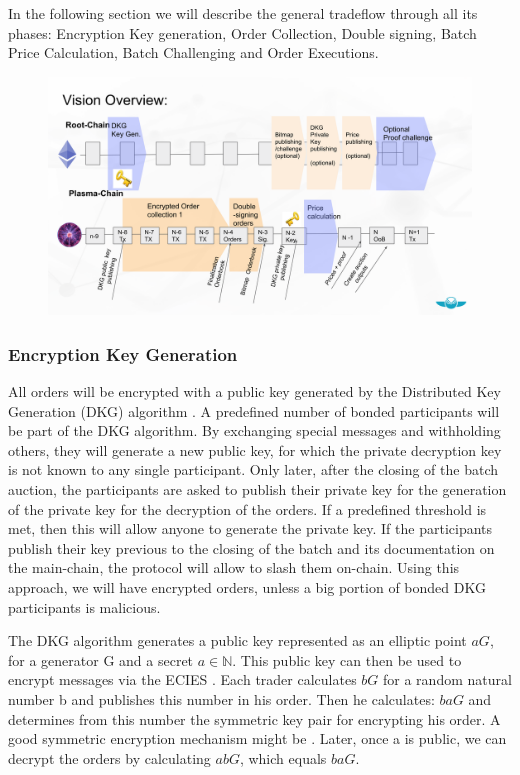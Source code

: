 \documentclass[11pt,parskip=full]{scrartcl}%
\begin{document}
In the following section we will describe the general tradeflow through all its phases: Encryption Key generation, Order Collection, Double signing, Batch Price Calculation, Batch Challenging and Order Executions.


\begin{figure}
\centering
\includegraphics[width=\textwidth]{overview_tradeflow.png}
\end{figure}



\subsubsection{Encryption Key Generation}
All orders will be encrypted with a public key generated by the Distributed Key Generation (DKG) algorithm \cite{DKG}. A predefined number of bonded participants will be part of the DKG algorithm.  By exchanging special messages and withholding others, they will generate a new public key, for which the private decryption key is not known to any single participant. Only later, after the closing of the batch auction, the participants are asked to publish their private key for the generation of the private key for the decryption of the orders. If a predefined threshold is met, then this will allow anyone to generate the private key. If the participants publish their key previous to the closing of the batch and its documentation on the main-chain, the protocol will allow to slash them on-chain. Using this approach, we will have encrypted orders, unless a big portion of bonded DKG participants is malicious.

The DKG algorithm generates a public key represented as an elliptic point $aG\label{public key}$, for a generator G and a secret $a\in \mathbb{N}$. This public key can then be used to encrypt messages via the ECIES \cite{ECIES}. Each trader calculates $bG \label{salt}$ for a random natural number b and publishes this number in his order. Then he calculates: $baG$ and determines from this number the symmetric key pair for encrypting his order. A good symmetric encryption mechanism might be \cite{cipher}. Later, once a is public, we can decrypt the orders by calculating $abG$, which equals $baG$.
\end{document}
